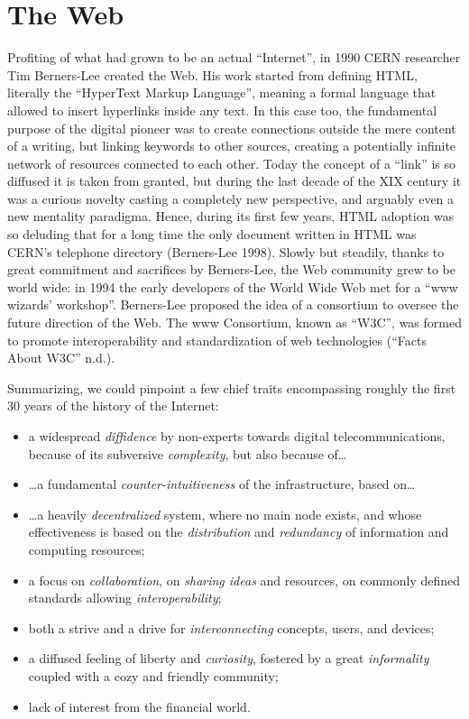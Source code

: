 \documentclass[
  a4paper,
]{book}
\providecommand{\tightlist}{%
  \setlength{\itemsep}{0pt}\setlength{\parskip}{0pt}}
\begin{document}
\hypertarget{the-web}{%
\section{The Web}\label{the-web}}

Profiting of what had grown to be an actual ``Internet'', in 1990 CERN researcher Tim Berners-Lee created the Web. His work started from defining HTML, literally the ``HyperText Markup Language'', meaning a formal language that allowed to insert hyperlinks inside any text. In this case too, the fundamental purpose of the digital pioneer was to create connections outside the mere content of a writing, but linking keywords to other sources, creating a potentially infinite network of resources connected to each other. Today the concept of a ``link'' is so diffused it is taken from granted, but during the last decade of the XIX century it was a curious novelty casting a completely new perspective, and arguably even a new mentality paradigma. Hence, during its first few years, HTML adoption was so deluding that for a long time the only document written in HTML was CERN's telephone directory {(Berners-Lee 1998)}. Slowly but steadily, thanks to great commitment and sacrifices by Berners-Lee, the Web community grew to be world wide: in 1994 the early developers of the World Wide Web met for a ``www wizards' workshop''. Berners-Lee proposed the idea of a consortium to oversee the future direction of the Web. The www Consortium, known as ``W3C'', was formed to promote interoperability and standardization of web technologies {({``Facts {About W3C}''} n.d.)}.

Summarizing, we could pinpoint a few chief traits encompassing roughly the first 30 years of the history of the Internet:

\begin{itemize}
\tightlist
\item
  a widespread \emph{diffidence} by non-experts towards digital telecommunications, because of its subversive \emph{complexity}, but also because of\ldots{}
\item
  \ldots a fundamental \emph{counter-intuitiveness} of the infrastructure, based on\ldots{}
\item
  \ldots a heavily \emph{decentralized} system, where no main node exists, and whose effectiveness is based on the \emph{distribution} and \emph{redundancy} of information and computing resources;
\item
  a focus on \emph{collaboration}, on \emph{sharing ideas} and resources, on commonly defined standards allowing \emph{interoperability};
\item
  both a strive and a drive for \emph{interconnecting} concepts, users, and devices;
\item
  a diffused feeling of liberty and \emph{curiosity}, fostered by a great \emph{informality} coupled with a cozy and friendly community;
\item
  lack of interest from the financial world.
\end{itemize}
\end{document}
